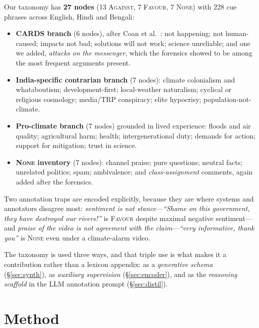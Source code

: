 \documentclass[twocolumn]{ceurart}
\begin{document}
Our taxonomy has \textbf{27 nodes} (13 \textsc{Against}, 7 \textsc{Favour},
7 \textsc{None}) with 228 cue phrases across English, Hindi and Bengali:

\begin{itemize}
  \item \textbf{CARDS branch} (6 nodes), after Coan et al.~\cite{coan2021}:
    not happening; not human-caused; impacts not bad; solutions will not work;
    science unreliable; and one we added, \emph{attacks on the messenger},
    which the forensics showed to be among the most frequent arguments present.
  \item \textbf{India-specific contrarian branch} (7 nodes): climate
    colonialism and whataboutism; development-first; local-weather naturalism;
    cyclical or religious cosmology; media/TRP conspiracy; elite hypocrisy;
    population-not-climate.
  \item \textbf{Pro-climate branch} (7 nodes) grounded in lived experience:
    floods and air quality; agricultural harm; health; intergenerational duty;
    demands for action; support for mitigation; trust in science.
  \item \textbf{\textsc{None} inventory} (7 nodes): channel praise; pure
    questions; neutral facts; unrelated politics; spam; ambivalence; and
    \emph{class-assignment} comments, again added after the forensics.
\end{itemize}

Two annotation traps are encoded explicitly, because they are where systems and
annotators disagree most:
\emph{sentiment is not stance}---\emph{``Shame on this government, they have
destroyed our rivers!''} is \textsc{Favour} despite maximal negative
sentiment---and \emph{praise of the video is not agreement with the
claim}---\emph{``very informative, thank you''} is \textsc{None} even under a
climate-alarm video.

The taxonomy is used three ways, and that triple use is what makes it a
contribution rather than a lexicon appendix: as a \emph{generative schema}
(\S\ref{sec:synth}), as \emph{auxiliary supervision} (\S\ref{sec:encoder}), and
as the \emph{reasoning scaffold} in the LLM annotation prompt
(\S\ref{sec:distil}).

\section{Method}
\end{document}
